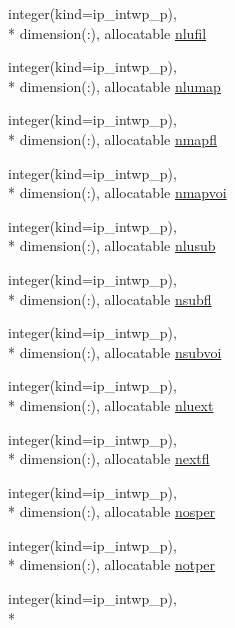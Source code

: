 \begin{DoxyCompactItemize}
integer(kind=ip\+\_\+intwp\+\_\+p), \\*
dimension(\+:), allocatable \hyperlink{classmod__oasis__namcouple_a31f62f64cbcf344e529d0576386d0751}{nlufil}
\item 
integer(kind=ip\+\_\+intwp\+\_\+p), \\*
dimension(\+:), allocatable \hyperlink{classmod__oasis__namcouple_a42367b4984c6ac4c69cbdcd315cb54e6}{nlumap}
\item 
integer(kind=ip\+\_\+intwp\+\_\+p), \\*
dimension(\+:), allocatable \hyperlink{classmod__oasis__namcouple_ac623e3e0906f57983efc1ab912ce9674}{nmapfl}
\item 
integer(kind=ip\+\_\+intwp\+\_\+p), \\*
dimension(\+:), allocatable \hyperlink{classmod__oasis__namcouple_adb1f8ce6bf94f488c10ef36b3afb8eca}{nmapvoi}
\item 
integer(kind=ip\+\_\+intwp\+\_\+p), \\*
dimension(\+:), allocatable \hyperlink{classmod__oasis__namcouple_aefed5eaa9924d249e979a5a772a46979}{nlusub}
\item 
integer(kind=ip\+\_\+intwp\+\_\+p), \\*
dimension(\+:), allocatable \hyperlink{classmod__oasis__namcouple_a6a94577996b440c31cac5b7d39e7f47a}{nsubfl}
\item 
integer(kind=ip\+\_\+intwp\+\_\+p), \\*
dimension(\+:), allocatable \hyperlink{classmod__oasis__namcouple_a0f31605257bfe125aafb6488a5065d4d}{nsubvoi}
\item 
integer(kind=ip\+\_\+intwp\+\_\+p), \\*
dimension(\+:), allocatable \hyperlink{classmod__oasis__namcouple_a7510ecfe3d0f141252450e4ba66209ba}{nluext}
\item 
integer(kind=ip\+\_\+intwp\+\_\+p), \\*
dimension(\+:), allocatable \hyperlink{classmod__oasis__namcouple_a8302411d5a02efd9a6dc7f784fbb0d4d}{nextfl}
\item 
integer(kind=ip\+\_\+intwp\+\_\+p), \\*
dimension(\+:), allocatable \hyperlink{classmod__oasis__namcouple_a484a71c213c89416924a0e23cfd46269}{nosper}
\item 
integer(kind=ip\+\_\+intwp\+\_\+p), \\*
dimension(\+:), allocatable \hyperlink{classmod__oasis__namcouple_ac154fc90756832bc90d02ea21f7c7e17}{notper}
\item 
integer(kind=ip\+\_\+intwp\+\_\+p), \\*

\end{DoxyCompactItemize}
